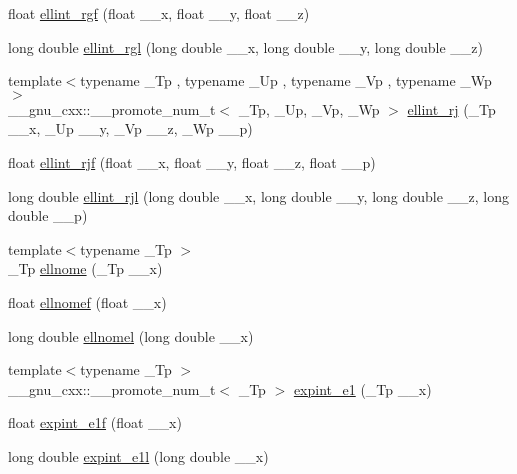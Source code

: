 \begin{DoxyCompactItemize}
float \hyperlink{namespace____gnu__cxx_a7a4ab348bf312a3425501ac8a3d16494}{ellint\+\_\+rgf} (float \+\_\+\+\_\+x, float \+\_\+\+\_\+y, float \+\_\+\+\_\+z)
\item 
long double \hyperlink{namespace____gnu__cxx_a563455d515ed845988552432108a21be}{ellint\+\_\+rgl} (long double \+\_\+\+\_\+x, long double \+\_\+\+\_\+y, long double \+\_\+\+\_\+z)
\item 
{\footnotesize template$<$typename \+\_\+\+Tp , typename \+\_\+\+Up , typename \+\_\+\+Vp , typename \+\_\+\+Wp $>$ }\\\+\_\+\+\_\+gnu\+\_\+cxx\+::\+\_\+\+\_\+promote\+\_\+num\+\_\+t$<$ \+\_\+\+Tp, \+\_\+\+Up, \+\_\+\+Vp, \+\_\+\+Wp $>$ \hyperlink{namespace____gnu__cxx_a61c6d7f5b930400eeb8de455667d4292}{ellint\+\_\+rj} (\+\_\+\+Tp \+\_\+\+\_\+x, \+\_\+\+Up \+\_\+\+\_\+y, \+\_\+\+Vp \+\_\+\+\_\+z, \+\_\+\+Wp \+\_\+\+\_\+p)
\item 
float \hyperlink{namespace____gnu__cxx_ace85b5190b04f57493878c5d672cfabd}{ellint\+\_\+rjf} (float \+\_\+\+\_\+x, float \+\_\+\+\_\+y, float \+\_\+\+\_\+z, float \+\_\+\+\_\+p)
\item 
long double \hyperlink{namespace____gnu__cxx_ab5405f1669b3ce8b560dc33aa5b97287}{ellint\+\_\+rjl} (long double \+\_\+\+\_\+x, long double \+\_\+\+\_\+y, long double \+\_\+\+\_\+z, long double \+\_\+\+\_\+p)
\item 
{\footnotesize template$<$typename \+\_\+\+Tp $>$ }\\\+\_\+\+Tp \hyperlink{namespace____gnu__cxx_a33c5720ef961c78b7d30a2867e3a587c}{ellnome} (\+\_\+\+Tp \+\_\+\+\_\+x)
\item 
float \hyperlink{namespace____gnu__cxx_a89b6107ec87332f3f30b6624771dbe90}{ellnomef} (float \+\_\+\+\_\+x)
\item 
long double \hyperlink{namespace____gnu__cxx_a07bb3776aebe767b30fb881bdb9ecc32}{ellnomel} (long double \+\_\+\+\_\+x)
\item 
{\footnotesize template$<$typename \+\_\+\+Tp $>$ }\\\+\_\+\+\_\+gnu\+\_\+cxx\+::\+\_\+\+\_\+promote\+\_\+num\+\_\+t$<$ \+\_\+\+Tp $>$ \hyperlink{namespace____gnu__cxx_a3696fc269b543a908d47bad7e98256e7}{expint\+\_\+e1} (\+\_\+\+Tp \+\_\+\+\_\+x)
\item 
float \hyperlink{namespace____gnu__cxx_ad6d75fcefac4a20b52f29d9b1bc3a57d}{expint\+\_\+e1f} (float \+\_\+\+\_\+x)
\item 
long double \hyperlink{namespace____gnu__cxx_a18cb55f0e83a9e369afaf5bae9e0772c}{expint\+\_\+e1l} (long double \+\_\+\+\_\+x)

\end{DoxyCompactItemize}
